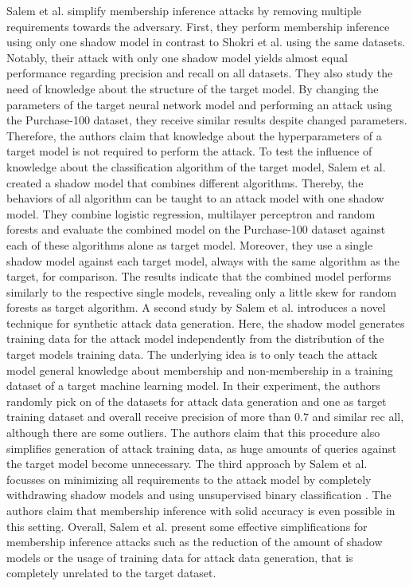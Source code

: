 \documentclass[runningheads]{llncs}
\begin{document}
Salem et al. \cite{salem2018ml} simplify membership inference attacks by removing multiple requirements towards the adversary. First, they perform membership inference using only one shadow model in contrast to Shokri et al. \cite{shokri2017membership} using the same datasets.
Notably, their attack with only one shadow model yields almost equal performance regarding precision and recall on all datasets.
They also study the need of knowledge about the structure of the target model. By changing the parameters of the target neural network model and performing an attack using the Purchase-100 dataset, they receive similar results despite changed parameters. 
Therefore, the authors claim that knowledge about the hyperparameters of a target model is not required to perform the attack. 
To test the influence of knowledge about the classification algorithm of the target model, Salem et al. created a shadow model that combines different algorithms. Thereby, the behaviors of all algorithm can be taught to an attack model with one shadow model. They combine logistic regression, multilayer perceptron and random forests and evaluate the combined model on the Purchase-100 dataset against each of these algorithms alone as target model. Moreover, they use a single shadow model against each target model, always with the same algorithm as the target, for comparison. The results indicate that the combined model performs similarly to the respective single models, revealing only a little skew for random forests as target algorithm.
A second study by Salem et al. introduces a novel technique for synthetic attack data generation. Here, the shadow model generates training data for the attack model independently from the distribution of the target models training data. The underlying idea is to only teach the attack model general knowledge about membership and non-membership in a training dataset of a target machine learning model. In their experiment, the authors randomly pick on of the datasets for attack data generation and one as target training dataset and overall receive precision of more than $0.7$ and similar rec  all, although there are some outliers. The authors claim that this procedure also simplifies generation of attack training data, as huge amounts of queries against the target model become unnecessary.
The third approach by Salem et al. focusses on minimizing all requirements to the attack model by completely withdrawing shadow models and using unsupervised binary classification \cite{salem2018ml}. The authors claim that membership inference with solid accuracy is even possible in this setting.
Overall, Salem et al. present some effective simplifications for membership inference attacks such as the reduction of the amount of shadow models or the usage of training data for attack data generation, that is completely unrelated to the target dataset.
\end{document}
